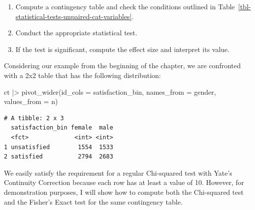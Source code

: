 \documentclass[
  letterpaper,
  DIV=11,
  numbers=noendperiod]{scrreprt}
\newenvironment{Shaded}{\begin{snugshade}}{\end{snugshade}}
\newcommand{\AttributeTok}[1]{\textcolor[rgb]{0.40,0.45,0.13}{#1}}
\newcommand{\CommentTok}[1]{\textcolor[rgb]{0.37,0.37,0.37}{#1}}
\newcommand{\FunctionTok}[1]{\textcolor[rgb]{0.28,0.35,0.67}{#1}}
\newcommand{\NormalTok}[1]{\textcolor[rgb]{0.00,0.23,0.31}{#1}}
\newcommand{\SpecialCharTok}[1]{\textcolor[rgb]{0.37,0.37,0.37}{#1}}
\begin{document}
\begin{enumerate}
\def\labelenumi{\arabic{enumi}.}
\item
  Compute a contingency table and check the conditions outlined in
  Table~\ref{tbl-statistical-tests-unpaired-cat-variables}.
\item
  Conduct the appropriate statistical test.
\item
  If the test is significant, compute the effect size and interpret its
  value.
\end{enumerate}

Considering our example from the beginning of the chapter, we are
confronted with a 2x2 table that has the following distribution:

\begin{Shaded}
\begin{Highlighting}[]
\NormalTok{ct }\SpecialCharTok{|\textgreater{}} \FunctionTok{pivot\_wider}\NormalTok{(}\AttributeTok{id\_cols =}\NormalTok{ satisfaction\_bin,}
                   \AttributeTok{names\_from =}\NormalTok{ gender,}
                   \AttributeTok{values\_from =}\NormalTok{ n)}
\end{Highlighting}
\end{Shaded}

\begin{verbatim}
# A tibble: 2 x 3
  satisfaction_bin female  male
  <fct>             <int> <int>
1 unsatisfied        1554  1533
2 satisfied          2794  2683
\end{verbatim}

We easily satisfy the requirement for a regular Chi-squared test with
Yate's Continuity Correction because each row has at least a value of
10. However, for demonstration purposes, I will show how to compute both
the Chi-squared test and the Fisher's Exact test for the same
contingency table.

\begin{Shaded}
\end{Shaded}
\end{document}
